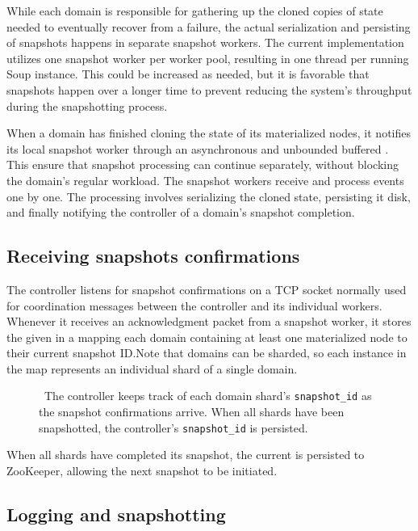 While each domain is responsible for gathering up the cloned copies of state
needed to eventually recover from a failure, the actual serialization and
persisting of snapshots happens in separate snapshot workers. The current
implementation utilizes one snapshot worker per worker pool, resulting in one
thread per running Soup instance. This could be increased as needed, but it is
favorable that snapshots happen over a longer time to prevent reducing the
system's throughput during the snapshotting process.

When a domain has finished cloning the state of its materialized nodes, it
notifies its local snapshot worker through an asynchronous and unbounded
buffered
.
This ensure that snapshot processing can continue separately, without blocking
the domain's regular workload. The snapshot workers receive and process
 events one by one. The processing involves
serializing the cloned state, persisting it disk, and finally notifying the
controller of a domain's snapshot completion.

\subsection{Receiving snapshots confirmations}

The controller listens for snapshot confirmations on a TCP socket normally used
for coordination messages between the controller and its individual workers.
Whenever it receives an acknowledgment packet from a snapshot worker, it stores
the given  in a  mapping each domain containing
at least one materialized node to their current snapshot ID.\@ Note that domains
can be sharded, so each instance in the map represents an individual shard of a
single domain.

\begin{figure}[H]
  
  \caption{\
    The controller keeps track of each domain shard's \texttt{snapshot\_id} as
    the snapshot confirmations arrive. When all shards have been snapshotted,
    the controller's \texttt{snapshot\_id} is persisted.
  }\label{fig:snapshot-id}
\end{figure}

When all shards have completed its snapshot, the current  is
persisted to ZooKeeper, allowing the next snapshot to be initiated.

\subsection{Logging and snapshotting}

